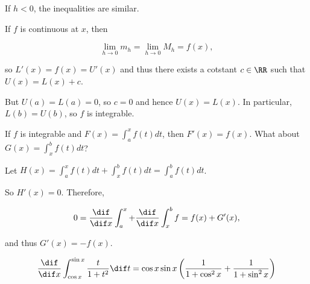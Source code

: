 \documentclass[11pt]{scrartcl}
\begin{document}
If $h < 0$, the inequalities are similar.

If $f$ is continuous at $x$, then

\begin{equation*}
\lim_{h\to 0}m_h = \lim_{h\to 0}M_h = f(x),
\end{equation*}

so $L'(x) = f(x) = U'(x)$ and thus there exists a cotstant $c\in \RR$ such that $U(x) = L(x) + c$.

But $U(a) = L(a) = 0$, so $c = 0$ and hence $U(x) = L(x)$. In
particular, $L(b) = U(b)$, so $f$ is integrable.

\begin{ques*}

If $f$ is integrable and $F(x) = \int_a^xf(t)dt$, then $F'(x) = f(x)$. What about $G(x) = \int_{x}^bf(t)dt$?

\end{ques*}

\begin{answer*}

  Let $H(x) = \int_a^xf(t)dt +\int_x^bf(t)dt = \int_a^bf(t) dt$.

  So $H'(x) = 0$. Therefore,


  \begin{equation*}
    0 = \frac{\dif}{\dif x}\int_a^x + \frac{\dif}{\dif x}\int_x^bf = f(x) + G'(x),
  \end{equation*}

  and thus $G'(x) = - f(x)$.
\end{answer*}

\begin{example}
  \begin{align}
    \frac{\dif }{\dif x} \int_{\cos x}^{\sin x}\frac{t}{1+t^{2}}\dif t = \cos x \sin x \left( \frac{1}{1+\cos^2x} + \frac{1}{1+\sin^2x} \right)
  \end{align}
\end{example}
\end{document}
